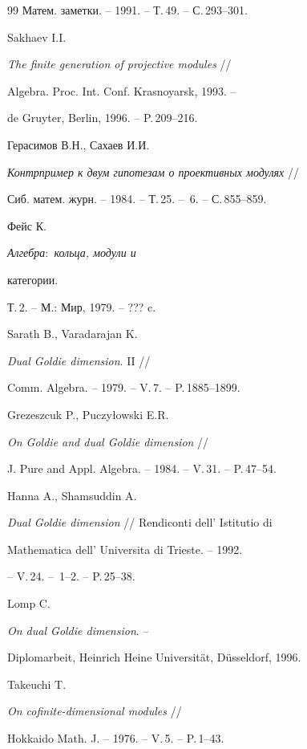 \begin{thebibliography}{99}
Матем. заметки. -- 1991. -- Т.\,49. -- С.\,293--301. 




Sakhaev I.I.


{\em The finite generation of projective modules} // 


Algebra. Proc. Int. Conf. Krasnoyarsk, 1993. -- 


de Gruyter, Berlin, 1996. -- P.\,209--216. 




Герасимов В.Н., Сахаев И.И.


{\em Контрпример к двум гипотезам о проективных модулях} // 


Сиб. матем. журн. -- 1984. -- Т.\,25. -- \No\,6. -- С.\,855--859.




Фейс К. {\em Алгебра$:$ кольца, модули и


категории.} Т.\,2. -- М.: Мир, 1979. -- ??? c.




Sarath B., Varadarajan K.


{\em Dual Goldie dimension}. II // 


Comm. Algebra. -- 1979. -- V.\,7. -- P.\,1885--1899. 




Grezeszcuk P., Puczy{\l}owski E.R.


{\em On Goldie and dual Goldie dimension} // 


J. Pure and Appl. Algebra. -- 1984. -- V.\,31. -- P.\,47--54. 




Hanna A., Shamsuddin A.


{\em Dual Goldie dimension} // Rendiconti dell' Istitutio di


Mathematica dell' Universita di Trieste. -- 1992.


-- V.\,24. -- \No\,1--2. -- P.\,25--38.




Lomp C. 


{\em On dual Goldie dimension}. -- 


Diplomarbeit, Heinrich Heine Universit\"at, D\"usseldorf, 1996.




Takeuchi T.


{\em On cofinite-dimensional modules} // 


Hokkaido Math. J. -- 1976. -- V.\,5. -- P.\,1--43. 



\end{thebibliography}
